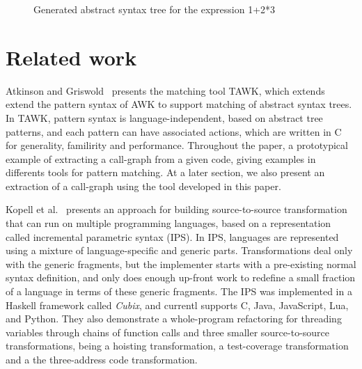 \begin{figure*}
   \centering
   
   
   \caption{Generated abstract syntax tree for the expression 1+2*3}
   \label{fig:generated-ast}
\end{figure*}


\section{Related work}

Atkinson and Griswold~\cite{atkinson2006-effective-pattern-matching} presents 
the matching tool TAWK, which extends extend the pattern syntax of AWK to 
support matching of abstract syntax trees. In TAWK, pattern syntax is 
language-independent, based on abstract tree patterns, and each pattern can 
have associated actions, which are written in C for generality, familirity 
and performance. Throughout the paper, a prototypical example of extracting 
a call-graph from a given code, giving examples in differents tools for 
pattern matching.
At a later section, we also present an extraction of a call-graph using the
tool developed in this paper.

Kopell et al.~\cite{kopell2018-language-parametric-transformation} presents an
approach for building source-to-source transformation that can run on multiple
programming languages, based on a representation called incremental parametric
syntax (IPS).
In IPS, languages are represented using a mixture of language-specific and 
generic parts. Transformations deal only with the generic fragments, but 
the implementer starts with a pre-existing normal syntax definition, and 
only does enough up-front work to redefine a small fraction of a language 
in terms of these generic fragments.
The IPS was implemented in a Haskell framework called \textit{Cubix}, 
and currentl supports C, Java, JavaScript, Lua, and Python.
They also demonstrate a whole-program refactoring for threading variables
through chains of function calls and three smaller source-to-source 
transformations, being a hoisting transformation, a test-coverage 
transformation and a the three-address code transformation.

